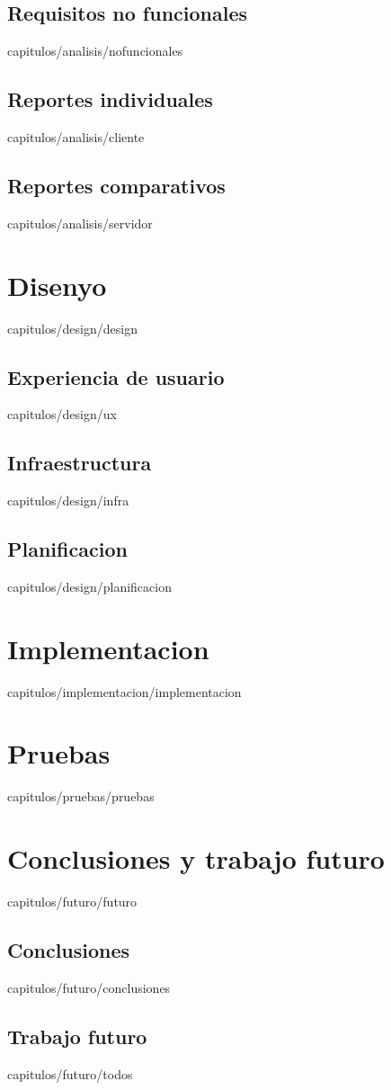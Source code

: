 \documentclass[epsbased,copyright,final,printable,covers,extendedindex,firstnumbered,tfg,gnuplot]{thesis}
\begin{document}
  \section{Requisitos no funcionales\label{SEC:NOFUNCIONALES}}{capitulos/analisis/nofuncionales}
  \section{Reportes individuales\label{SEC:CLIENTE}}{capitulos/analisis/cliente}
  \section{Reportes comparativos\label{SEC:SERVIDOR}}{capitulos/analisis/servidor}

\chapter{Disenyo\label{CAP:DESIGN}}{capitulos/design/design}
  \section{Experiencia de usuario\label{SEC:UX}}{capitulos/design/ux}
  \section{Infraestructura\label{SEC:INFRA}}{capitulos/design/infra}
  \section{Planificacion\label{SEC:PLANIFICACION}}{capitulos/design/planificacion}

\chapter{Implementacion\label{CAP:IMPLEMENTACION}}{capitulos/implementacion/implementacion}

\chapter{Pruebas\label{CAP:PRUEBAS}}{capitulos/pruebas/pruebas}

\chapter{Conclusiones y trabajo futuro\label{CAP:FUTURO}}{capitulos/futuro/futuro}
  \section{Conclusiones\label{SEC:CONCLUSIONES}}{capitulos/futuro/conclusiones}
  \section{Trabajo futuro\label{SEC:TODOS}}{capitulos/futuro/todos}
\end{document}
